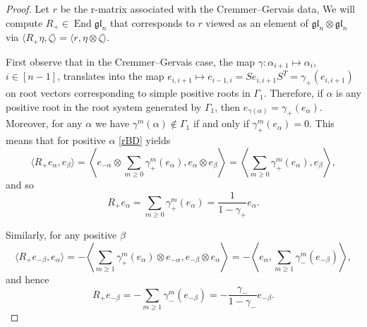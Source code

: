 \documentclass{amsart}
\theoremstyle{definition}
\theoremstyle{remark}
\numberwithin{equation}{section}
\numberwithin{theorem}{section}
\begin{document}
\begin{proof} Let $r$ be the r-matrix associated with the Cremmer--Gervais data,
We will compute $R_+\in {\operatorname{End}} {\mathfrak g\mathfrak l}_n$ that corresponds to $r$ viewed as an element of 
$ {\mathfrak g\mathfrak l}_n\otimes {\mathfrak g\mathfrak l}_n$ via $\langle R_+ \eta, \zeta \rangle =
\langle r, \eta\otimes\zeta \rangle$.

First observe that in the Cremmer--Gervais case, the map $\gamma : \alpha_{i+1} \mapsto \alpha_i$,  
$i\in  [n-1]$, 
translates into the map $e_{i,i+1} \mapsto e_{i-1,i} = S e_{i,i+1} S^T = \gamma_+(e_{i,i+1} )$ on root vectors 
corresponding to simple
positive roots in $\Gamma_1$. Therefore, if $\alpha$ is any positive root in the root system generated by 
$\Gamma_1$, then
$e_{\gamma(\alpha)} = \gamma_+(e_\alpha)$. Moreover, for any $\alpha$ we have $\gamma^m(\alpha)\notin \Gamma_1$ 
if and only if 
$\gamma_+^m(e_\alpha)=0$. This means that for positive $\alpha$ \eqref{rBD} yields
\[
\langle R_+ e_\alpha, e_\beta \rangle = 
\left\langle e_{-\alpha} \otimes \sum_{m\geq 0} \gamma^m_+(e_\alpha),e_{\alpha} \otimes  e_\beta\right\rangle=
\left\langle \sum_{m\geq 0} \gamma^m_+(e_\alpha),e_\beta\right\rangle,
\]
and so
\[
R_+e_\alpha=\sum_{m\geq 0} \gamma^m_+(e_\alpha)=\frac{1}{1-\gamma_+} e_\alpha. 
\]

Similarly, for any positive $\beta$
\[
\langle R_+ e_{-\beta}, e_\alpha \rangle = 
-\left\langle \sum_{m\geq 1} \gamma^m_+(e_\alpha) \otimes e_{-\alpha}, 
e_{-\beta}\otimes e_\alpha\right\rangle=-\left\langle e_\alpha,  \sum_{m\geq 1} \gamma^m_-(e_{-\beta})\right\rangle,
\]
and hence
 \[
R_+e_{-\beta}=-\sum_{m\geq 1} \gamma^m_-(e_{-\beta})=-\frac{\gamma_-}{1-\gamma_-} e_{-\beta}.
\]


\end{proof}
\end{document}
